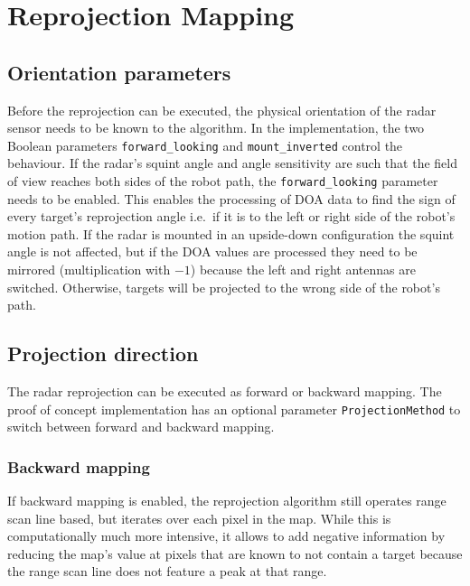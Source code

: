 \section{Reprojection Mapping}\label{reprojection-mapping}

\subsection{Orientation parameters}\label{orientation-parameters}

Before the reprojection can be executed, the physical orientation of the
radar sensor needs to be known to the algorithm. In the implementation,
the two Boolean parameters \texttt{forward\_looking} and
\texttt{mount\_inverted} control the behaviour. If the radar's squint
angle and angle sensitivity are such that the field of view reaches both
sides of the robot path, the \texttt{forward\_looking} parameter needs
to be enabled. This enables the processing of DOA data to find the sign
of every target's reprojection angle i.e.~if it is to the left or right
side of the robot's motion path. If the radar is mounted in an
upside-down configuration the squint angle is not affected, but if the
DOA values are processed they need to be mirrored (multiplication with
\(-1\)) because the left and right antennas are switched. Otherwise,
targets will be projected to the wrong side of the robot's path.

\subsection{Projection direction}\label{projection-direction}

The radar reprojection can be executed as forward or backward mapping.
The proof of concept implementation has an optional parameter
\texttt{ProjectionMethod} to switch between forward and backward
mapping.

\subsubsection{Backward mapping}\label{backward-mapping}

If backward mapping is enabled, the reprojection algorithm still
operates range scan line based, but iterates over each pixel in the map.
While this is computationally much more intensive, it allows to add
negative information by reducing the map's value at pixels that are
known to not contain a target because the range scan line does not
feature a peak at that range.

